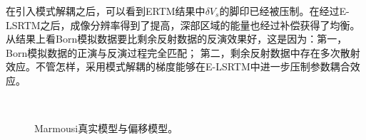 在引入模式解耦之后，可以看到ERTM结果中$\delta
V_s$的脚印已经被压制。在经过E-LSRTM之后，成像分辨率得到了提高，深部区域的能量也经过补偿获得了均衡。
从结果上看Born模拟数据要比剩余反射数据的反演效果好，这是因为：第一，Born模拟数据的正演与反演过程完全匹配；
第二，剩余反射数据中存在多次散射效应。不管怎样，采用模式解耦的梯度能够在E-LSRTM中进一步压制参数耦合效应。
\begin{figure}[!htb]
   \centering
   \\
   \caption{Marmousi真实模型与偏移模型。}
   \label{fig:TrueAndInitial_2}
\end{figure}

